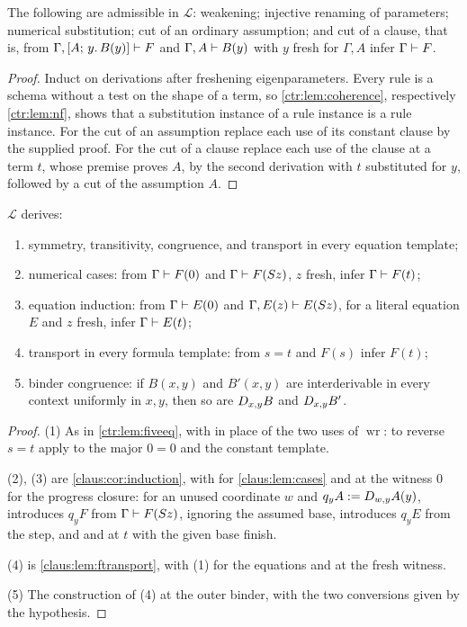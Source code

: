 \begin{lemma}\label{ctr:lem:libstruct}
The following are admissible in $\mathcal L$: weakening; injective renaming of parameters;
numerical substitution; cut of an ordinary assumption; and cut of a clause, that is, from
$\Gamma,[A;\,y.\,B(y)]\vdash F$ and $\Gamma,A\vdash B(y)$ with $y$ fresh for $\Gamma,A$
infer $\Gamma\vdash F$.
\end{lemma}
\begin{proof}
Induct on derivations after freshening eigenparameters. Every rule is a schema without a
test on the shape of a term, so \cref{ctr:lem:coherence}, respectively \cref{ctr:lem:nf},
shows that a substitution instance of a rule instance is a rule instance. For the cut of an
assumption replace each use of its constant clause by the supplied proof. For the cut of a
clause replace each use of the clause at a term $t$, whose premise proves $A$, by the second
derivation with $t$ substituted for $y$, followed by a cut of the assumption $A$.
\end{proof}

\begin{lemma}\label{ctr:lem:libderived}
$\mathcal L$ derives:
\begin{enumerate}
\item symmetry, transitivity, congruence, and transport in every equation template;
\item numerical cases: from $\Gamma\vdash F(0)$ and $\Gamma\vdash F(S z)$, $z$ fresh,
infer $\Gamma\vdash F(t)$;
\item equation induction: from $\Gamma\vdash E(0)$ and $\Gamma,E(z)\vdash E(S z)$, for a
literal equation $E$ and $z$ fresh, infer $\Gamma\vdash E(t)$;
\item transport in every formula template: from $s=t$ and $F(s)$ infer $F(t)$;
\item binder congruence: if $B(x,y)$ and $B'(x,y)$ are interderivable in every context
uniformly in $x,y$, then so are $D_{x,y}B$ and $D_{x,y}B'$.
\end{enumerate}
\end{lemma}
\begin{proof}
(1) As in \cref{ctr:lem:fiveeq}, with  in place of the two uses of
$\operatorname{wr}$: to reverse $s=t$ apply  to the major $0=0$ and the
constant template.

(2), (3) are \cref{claus:cor:induction}, with  for \cref{claus:lem:cases}
and  at the witness $0$ for the progress closure: for an unused coordinate $w$
and $q_yA\mathrel{:=}D_{w,y}A(y)$,  introduces $q_yF$ from
$\Gamma\vdash F(S z)$, ignoring the assumed base,  introduces $q_yE$
from the step, and  and  at $t$ with the given base finish.

(4) is \cref{claus:lem:ftransport}, with (1) for the equations and  at the
fresh witness.

(5) The construction of (4) at the outer binder, with the two conversions given by the
hypothesis.
\end{proof}

